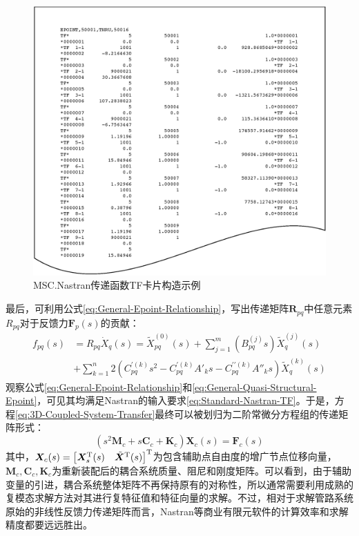 \begin{figure}[!htb]
  \centering
  \includegraphics[width=\linewidth]{TF-Card-Construction}
  \caption{MSC.Nastran传递函数TF卡片构造示例}\label{TF-Card-Construction}
\end{figure}

最后，可利用公式\eqref{eq:General-Epoint-Relationship}，写出传递矩阵$\boldsymbol{R}_{pq}$中任意元素$R_{pq}$对于反馈力$\boldsymbol{F}_p(s)$的贡献：
\begin{equation}
	\label{eq:General-Quasi-Structural-Epoint}
	\begin{aligned}
		f_{pq}(s)&= R_{pq}\dot{X}_q(s)={\tilde{X}}_{pq}^{(0)}(s) + 
		\sum_{j=1}^m (B_{pq}^{(j)}s){\tilde{X}}_{q}^{(j)}(s) \\
		&+\sum_{k=1}^n 2(C_{pq}^{\prime (k)} s^2- C_{pq}^{\prime (k)} A'_k s- C_{pq}^{\prime\prime(k)} A''_ks){\tilde{X}}_{q}^{(k)}(s)
	\end{aligned}
\end{equation}
观察公式\eqref{eq:General-Epoint-Relationship}和\eqref{eq:General-Quasi-Structural-Epoint}，可见其均满足Nastran的输入要求\eqref{eq:Standard-Nastran-TF}。于是，方程\eqref{eq:3D-Coupled-System-Transfer}最终可以被划归为二阶常微分方程组的传递矩阵形式：
\begin{equation}
	\label{eq:3D-Final-Coupled-Transfer-Function}
	(s^2\boldsymbol{M}_c+s\boldsymbol{C}_c+\boldsymbol{K}_c)\boldsymbol{X}_c(s)=\boldsymbol{F}_c(s)
\end{equation}
其中，$\boldsymbol{X}_c(s)=\left[ \boldsymbol{X}_s^{\mathrm{T}}(s)\quad \tilde{\boldsymbol{X}}^{\mathrm{T}}(s) \right]^{\mathrm{T}}$为包含辅助点自由度的增广节点位移向量，$\boldsymbol{M}_c,\boldsymbol{C}_c,\boldsymbol{K}_c$为重新装配后的耦合系统质量、阻尼和刚度矩阵。可以看到，由于辅助变量的引进，耦合系统整体矩阵不再保持原有的对称性，所以通常需要利用成熟的复模态求解方法对其进行复特征值和特征向量的求解。不过，相对于求解管路系统原始的非线性反馈力传递矩阵而言，Nastran等商业有限元软件的计算效率和求解精度都要远远胜出。

